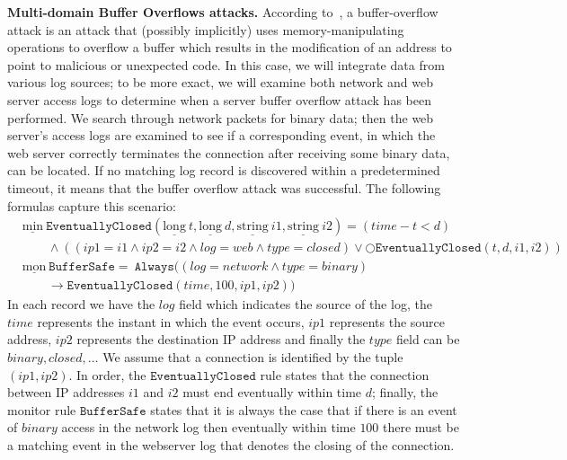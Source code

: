 \documentclass[english]{article}
\begin{document}
\textbf{Multi-domain Buffer Overflows attacks.}
According to~\cite{piromsopa2006buffer}, a buffer-overflow attack is an attack that (possibly implicitly) uses memory-manipulating operations to overflow a buffer which results in the modification of an address to point to malicious or unexpected code. In this case, we will integrate data from various log sources; to be more exact, we will examine both network and web server access logs to determine when a server buffer overflow attack has been performed. We search through network packets for binary data; then the web server's access logs are examined to see if a corresponding event, in which the web server correctly terminates the connection after receiving some binary data, can be located. If no matching log record is discovered within a predetermined timeout, it means that the buffer overflow attack was successful. The following formulas capture this scenario:
\begin{align*} 
    & \underline{\text{min}}\ \mathtt{EventuallyClosed}(\underline{\text{long}}\ t,\underline{\text{long}}\ d,\underline{\text{string}}\ i1,\underline{\text{string}}\ i2) = (time-t<d)\\
    & \quad\quad\land ((ip1=i1\land ip2=i2\land log=web\land type=closed)\lor \bigcirc\mathtt{EventuallyClosed}(t,d,i1,i2) ) \\
    & \underline{\text{mon}}\ \mathtt{BufferSafe} =\ \mathtt{Always}((log=network\land type=binary) \\
    & \quad\quad\rightarrow\mathtt{EventuallyClosed}(time,100,ip1,ip2))
\end{align*}
In each record we have the $log$ field which indicates the source of the log, the $time$ represents the instant in which the event occurs, $ip1$ represents the source address, $ip2$ represents the destination IP address and finally the $type$ field can be $binary, closed,\ldots$ We assume that a connection is identified by the tuple $(ip1,ip2)$. In order, the $\mathtt{EventuallyClosed}$ rule states that the connection between IP addresses $i1$ and $i2$ must end eventually within time $d$; finally, the monitor rule $\mathtt{BufferSafe}$ states that it is always the case that if there is an event of $binary$ access in the network log then eventually within time $100$ there must be a matching event in the webserver log that denotes the closing of the connection. 
\end{document}
